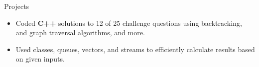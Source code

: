\documentclass{resume} %
\begin{document}
\begin{workSection}{Projects}
	

	\customItem[
	title=\href{https://github.com/AshkanArabim/advent-of-code-2022}{Advent of Code 2022 - Annual Programming Challenge \faExternalLink},
	duration=August 2023,
	]
	\begin{itemize}
		\vspace{-0.5em}
		\itemsep -6pt {}
		\item Coded \textbf{C++} solutions to 12 of 25 challenge questions using backtracking, and graph traversal algorithms, and more.
		\item Used classes, queues, vectors, and streams to efficiently calculate results based on given inputs.
	\end{itemize}




\end{workSection}
\end{document}
